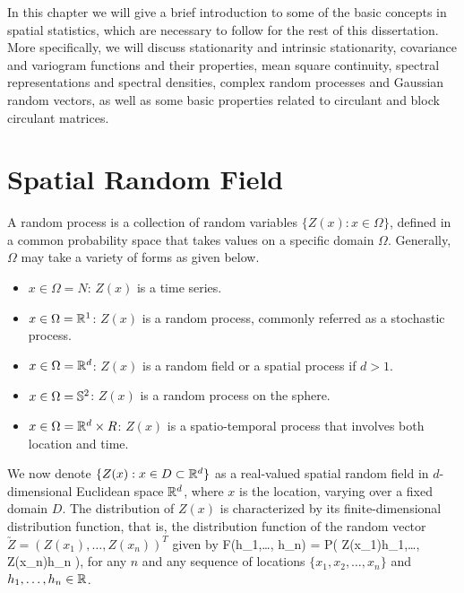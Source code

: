 

%

In this chapter we will give a brief introduction to some of the basic concepts in spatial statistics, which are necessary to follow for the rest of this dissertation. More specifically, we will discuss stationarity and intrinsic stationarity, covariance and variogram functions and their properties, mean square continuity, spectral representations and spectral densities, complex random processes and Gaussian random vectors, as well as some basic properties related to circulant and block circulant matrices.   %


\section{Spatial Random Field}
A random process is a collection of random variables $\{Z(x): x \in \Omega\}$, defined in a common probability space that takes values on a specific domain $\Omega$. Generally, $\Omega$ may take a variety of forms as given below.

\begin{itemize}
	\item $x \in \Omega = N$: $Z(x)$ is a time series.
	\item $x \in \Omega = \mathbb{R}^1$: $Z(x)$ is a random process, commonly referred as a stochastic process.
	\item $x \in \Omega = \mathbb{R}^d$: $Z(x)$ is a random field or a spatial process if $d > 1$.
	\item $x \in \Omega = \mathbb{S}^2$: $Z(x)$ is a random process on the sphere.
	\item $x \in \Omega = \mathbb{R}^d\times R$: $Z(x)$ is a spatio-temporal process that involves both location and time.
\end{itemize}

We now denote $\{Z(x): x \in D \subset \mathbb{R}^d\}$ as a real-valued spatial random field in $d$-dimensional Euclidean space $\mathbb{R}^d$, where $x$ is the location, varying over a fixed domain $D$. The distribution of $Z(x)$ is characterized by its finite-dimensional distribution function, that is, the distribution function of the random vector $ \utilde{Z}=(Z(x_1),\ldots, Z(x_n) )^{T}$ given by
\beq
F(h_1,\ldots, h_n) = P( Z(x_1)\le h_1,\ldots, Z(x_n)\le h_n ),
\eeq
for any $n$ and any sequence of locations $\{x_1, x_2, \ldots, x_n\}$ and $h_1,\ldots, h_n \in \mathbb{R}$.


